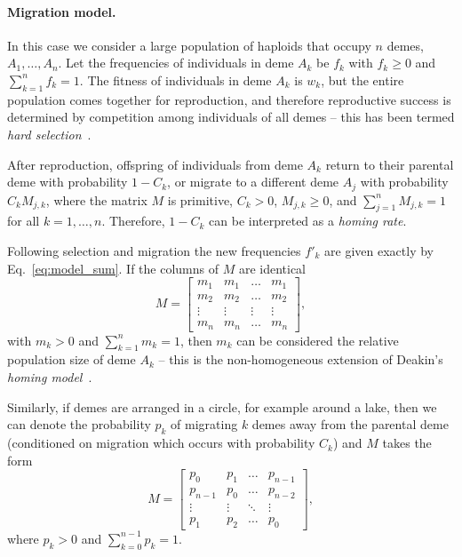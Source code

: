 \documentclass[9pt, a4paper, twocolumn]{extarticle}
\begin{document}
\paragraph*{Migration model.}\label{sec:mig_model}

In this case we consider a large population of haploids that occupy $n$ demes, $A_1, \ldots, A_n$.
Let the frequencies of individuals in deme $A_k$ be $f_k$ with $f_k \ge 0$ and $\sum_{k=1}^{n}{f_k} = 1$.
The fitness of individuals in deme $A_k$ is $w_k$, but the entire population comes together for reproduction, and therefore reproductive success is determined by competition among individuals of all demes -- this has been termed \emph{hard selection}~\citep{Wallace1975,Karlin1982}.

After reproduction, offspring of individuals from deme $A_k$ return to their parental deme with probability $1-C_k$, or migrate to a different deme $A_j$ with probability $C_k M_{j,k}$, where the matrix $M$ is primitive, $C_k > 0$, $M_{j,k} \ge 0$, and $\sum_{j=1}^{n}{M_{j,k}} = 1$ for all $k=1, \ldots, n$.
Therefore, $1-C_k$ can be interpreted as a \emph{homing rate}.

Following selection and migration the new frequencies $f'_k$ are given exactly by Eq.~\ref{eq:model_sum}.
If the columns of ${M}$ are identical
\begin{equation}
{M} = \begin{bmatrix}
m_1 & m_1 & \ldots & m_1 \\
m_2 & m_2 & \ldots & m_2 \\
\vdots & \vdots & \vdots & \vdots \\
m_n & m_n & \ldots & m_n
\end{bmatrix},
\end{equation}
with $m_k>0$ and $\sum_{k=1}^{n}{m_k}=1$,
then $m_k$ can be considered the relative population size of deme $A_k$ --
this is the non-homogeneous extension of Deakin's \emph{homing model}~\citep{Deakin1966,Karlin1982}.

Similarly, if demes are arranged in a circle, for example around a lake, 
then we can denote the probability $p_k$ of migrating $k$ demes away from the parental deme (conditioned on migration which occurs with probability $C_k$)
and ${M}$ takes the form
\begin{equation}
{M} = \begin{bmatrix}
p_0 & p_1 & \ldots & p_{n-1} \\
p_{n-1} & p_0 & \ldots & p_{n-2} \\
\vdots & \vdots & \ddots & \vdots \\
p_1 & p_2 & \ldots & p_0
\end{bmatrix},
\end{equation}
where $p_k > 0$ and $\sum_{k=0}^{n-1}{p_k}=1$.
\end{document}
